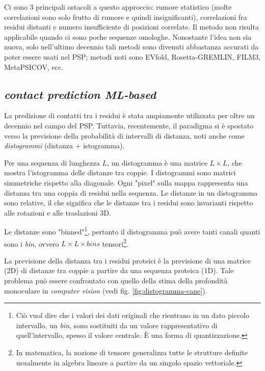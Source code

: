 {	\par Ci sono 3 principali ostacoli a questo approccio: rumore statistico (molte correlazioni sono solo frutto di rumore e quindi insignificanti), correlazioni fra residui distanti e numero insufficiente di posizioni correlate. Il metodo non risulta applicabile quando ci sono poche sequenze omologhe. Nonostante l'idea non sia nuova, solo nell'ultimo decennio tali metodi sono divenuti abbastanza accurati da poter essere usati nel PSP; metodi noti sono EVfold, Rosetta-GREMLIN, FILM3, MetaPSICOV, ecc.
	
}

\subsection{\textit{contact prediction ML-based}}

La predizione di contatti tra i residui è stata ampiamente utilizzata per oltre un decennio nel campo del PSP. Tuttavia, recentemente, il paradigma si è spostato verso la previsione della probabilità di intervalli di distanza, noti anche come \textit{distogrammi} (distanza + istogramma). 

\par Per una sequenza di lunghezza $L$, un distogramma è una matrice $L \times L$, che mostra l'istogramma delle distanze tra coppie. I distogrammi sono matrici simmetriche rispetto alla diagonale. Ogni "pixel" sulla mappa rappresenta una distanza tra una coppia di residui nella sequenza. Le distanze in un distogramma sono relative, il che significa che le distanze tra i residui sono invarianti rispetto alle rotazioni e alle traslazioni 3D.

\par Le distanze sono "binned"\footnote{Ciò vuol dire che i valori dei dati originali che rientrano in un dato piccolo intervallo, un \textit{bin}, sono sostituiti da un valore rappresentativo di quell'intervallo, spesso il valore centrale.  È una forma di quantizzazione.}, pertanto il distogramma può avere tanti canali quanti sono i \textit{bin}, ovvero $L\times L \times bins$ tensori\footnote{In matematica, la nozione di tensore generalizza tutte le strutture definite usualmente in algebra lineare a partire da un singolo spazio vettoriale.}.  \\

\par La previsione della distanza tra i residui proteici è la previsione di una matrice (2D) di distanze tra coppie a partire da una sequenza proteica (1D). Tale problema può essere confrontato con quello della stima della profondità monoculare in \textit{computer vision} (vedi fig. \ref{fig:distogramma-cane}).

